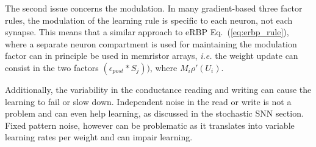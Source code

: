 \documentclass[english]{article}
\renewcommand{\refeq}[1]{{Eq.~(\ref{#1})}}
\newcommand{\refsec}[1]{{Sec.~\ref{#1}}}
\renewcommand{\cite}{\citep}
\begin{document}
The second issue concerns the modulation. 
In many gradient-based three factor rules, the modulation of the learning rule is specific to each neuron, not each synapse.
This means that a similar approach to \ac{eRBP} \refeq{eq:erbp_rule}, where a separate neuron compartment is used for maintaining the modulation factor can in principle be used in memristor arrays, \emph{i.e.} the weight update can consist in the two factors $(\epsilon_{post} \ast S_j))$, where $M_i \rho'(U_i)$. 

Additionally, the variability in the conductance reading and writing can cause the learning to fail or slow down. Independent noise in the read or write is not a problem and can even help learning, as discussed in the stochastic \ac{SNN} section. Fixed pattern noise, however can be problematic as it translates into variable learning rates per weight and can impair learning.


\end{document}
